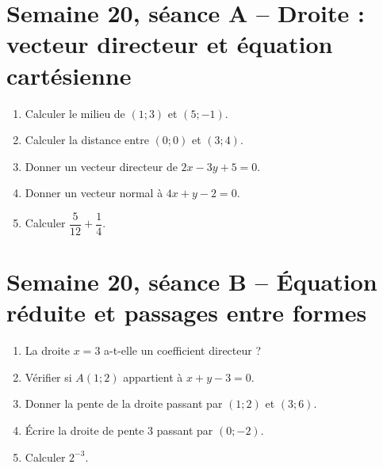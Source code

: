\section{Semaine 20, séance A -- Droite : vecteur directeur et équation cartésienne}
\begin{enumerate}
  \item Calculer le milieu de $(1;3)$ et $(5;-1)$.
  \item Calculer la distance entre $(0;0)$ et $(3;4)$.
  \item Donner un vecteur directeur de $2x-3y+5=0$.
  \item Donner un vecteur normal à $4x+y-2=0$.
  \item Calculer $\dfrac{5}{12}+\dfrac14$.
\end{enumerate}

\section{Semaine 20, séance B -- Équation réduite et passages entre formes}
\begin{enumerate}
  \item La droite $x=3$ a-t-elle un coefficient directeur ?
  \item Vérifier si $A(1;2)$ appartient à $x+y-3=0$.
  \item Donner la pente de la droite passant par $(1;2)$ et $(3;6)$.
  \item Écrire la droite de pente $3$ passant par $(0;-2)$.
  \item Calculer $2^{-3}$.
\end{enumerate}

